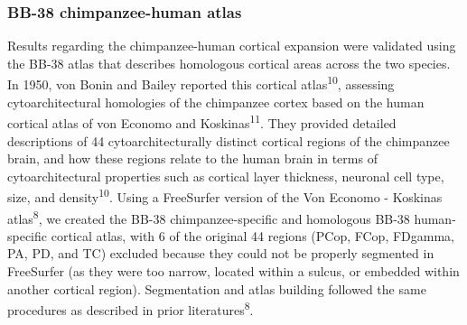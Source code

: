 \begin{refsection}
\subsubsection*{BB-38 chimpanzee-human atlas}
Results regarding the chimpanzee-human cortical expansion were validated using the BB-38 atlas that describes homologous cortical areas across the two species. In 1950, von Bonin and Bailey reported this cortical atlas\textsuperscript{10}, assessing cytoarchitectural homologies of the chimpanzee cortex based on the human cortical atlas of von Economo and Koskinas\textsuperscript{11}. They provided detailed descriptions of 44 cytoarchitecturally distinct cortical regions of the chimpanzee brain, and how these regions relate to the human brain in terms of cytoarchitectural properties such as cortical layer thickness, neuronal cell type, size, and density\textsuperscript{10}. Using a FreeSurfer version of the Von Economo - Koskinas atlas\textsuperscript{8}, we created the BB-38 chimpanzee-specific and homologous BB-38 human-specific cortical atlas, with 6 of the original 44 regions (PCop, FCop, FDgamma, PA, PD, and TC) excluded because they could not be properly segmented in FreeSurfer (as they were too narrow, located within a sulcus, or embedded within another cortical region). Segmentation and atlas building followed the same procedures as described in prior literatures\textsuperscript{8}.


\end{refsection}
